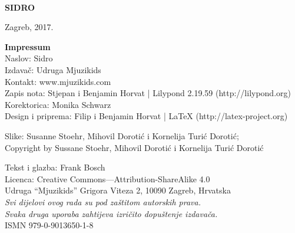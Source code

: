 \documentclass[a4paper,twoside, svgnames]{article}
\newcommand{\doccolor}{\color{red}}
\newcommand*{\titleTH}{\begingroup
\centering
\vspace*{5cm}
{\doccolor{\fontsize{60}{70}\selectfont \textrm{\bfseries PJESMARICA}}}\\[\baselineskip]
{\fontsize{113}{123}\selectfont \textsf{\textbf{SIDRO}}}\par
\vfill %
{Zagreb, 2017.}\par %
\endgroup}
\begin{document}
\thispagestyle {empty}
\titleTH

\newpage
\thispagestyle {empty}
\begin{center}
\vspace*{\fill}
\begin{onehalfspacing}
\textbf{\textsf{Impressum}}\\
\vspace{5pt}
Naslov: Sidro\\
Izdavač: Udruga Mjuzikids\\
Kontakt: www.mjuzikids.com\\
Zapis nota: Stjepan i Benjamin Horvat | Lilypond 2.19.59 (http://lilypond.org)\\
Korektorica: Monika Schwarz\\
Design i priprema: Filip i Benjamin Horvat | LaTeX (http://latex-project.org)
\par
\begin{singlespacing}
\par
Slike: Susanne Stoehr, Mihovil Dorotić i Kornelija Turić Dorotić;\\ Copyright by Sussane Stoehr, Mihovil Dorotić i Kornelija Turić Dorotić\\
\par
\end{singlespacing}
Tekst i glazba: Frank Bosch\\
Licenca: Creative Commons—Attribution-ShareAlike 4.0\\
Udruga “Mjuzikids” Grigora Viteza 2, 10090 Zagreb, Hrvatska\\

\singlespacing
\textit{Svi dijelovi ovog rada su pod zaštitom autorskih prava.\\
Svaka druga uporaba zahtijeva izričito dopuštenje izdavača.}\\

\onehalfspacing
ISMN 979-0-9013650-1-8
\par
\end{onehalfspacing}
\end{center}

\newpage
\begin{adjustwidth*}{2cm}{2cm}
\renewcommand{\cftsecfont}{\sffamily}
\renewcommand{\cftsecpagefont}{\sffamily}
\renewcommand{\cfttoctitlefont}{\rmfamily\fontsize{50}{60}\selectfont}
\renewcommand{\contentsname}{\rmfamily\hfill\doccolor Kazalo \hfill}
\renewcommand{\cftaftertoctitle}{\vspace*{2cm}}
\vspace*{1cm}
{\Large{\tableofcontents}}
\thispagestyle {empty}
\end{adjustwidth*}
\end{document}
